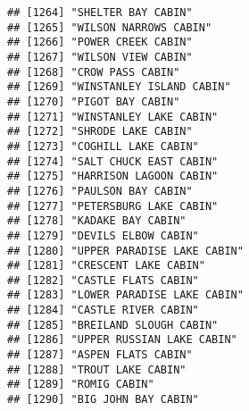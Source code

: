 \documentclass[
]{article}
\begin{document}
\begin{verbatim}
## [1264] "SHELTER BAY CABIN"                                                                   
## [1265] "WILSON NARROWS CABIN"                                                                
## [1266] "POWER CREEK CABIN"                                                                   
## [1267] "WILSON VIEW CABIN"                                                                   
## [1268] "CROW PASS CABIN"                                                                     
## [1269] "WINSTANLEY ISLAND CABIN"                                                             
## [1270] "PIGOT BAY CABIN"                                                                     
## [1271] "WINSTANLEY LAKE CABIN"                                                               
## [1272] "SHRODE LAKE CABIN"                                                                   
## [1273] "COGHILL LAKE CABIN"                                                                  
## [1274] "SALT CHUCK EAST CABIN"                                                               
## [1275] "HARRISON LAGOON CABIN"                                                               
## [1276] "PAULSON BAY CABIN"                                                                   
## [1277] "PETERSBURG LAKE CABIN"                                                               
## [1278] "KADAKE BAY CABIN"                                                                    
## [1279] "DEVILS ELBOW CABIN"                                                                  
## [1280] "UPPER PARADISE LAKE CABIN"                                                           
## [1281] "CRESCENT LAKE CABIN"                                                                 
## [1282] "CASTLE FLATS CABIN"                                                                  
## [1283] "LOWER PARADISE LAKE CABIN"                                                           
## [1284] "CASTLE RIVER CABIN"                                                                  
## [1285] "BREILAND SLOUGH CABIN"                                                               
## [1286] "UPPER RUSSIAN LAKE CABIN"                                                            
## [1287] "ASPEN FLATS CABIN"                                                                   
## [1288] "TROUT LAKE CABIN"                                                                    
## [1289] "ROMIG CABIN"                                                                         
## [1290] "BIG JOHN BAY CABIN"                                                                  

\end{verbatim}
\end{document}

